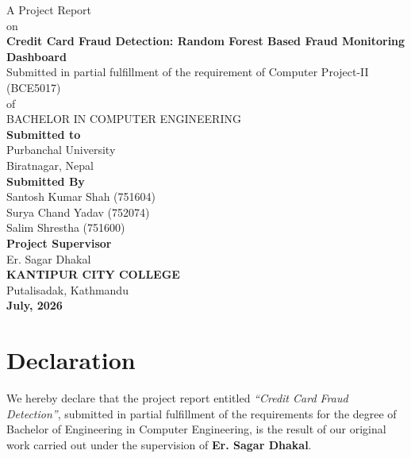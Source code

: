 \documentclass[12pt,a4paper]{report}
\newcommand{\projecttitle}{Credit Card Fraud Detection}
\newcommand{\projectsubtitle}{Random Forest Based Fraud Monitoring Dashboard}
\newcommand{\projectdate}{July, 2026}
\newcommand{\supervisor}{Er. Sagar Dhakal}
\newcommand{\college}{Kantipur City College}
\newcommand{\collegeaddress}{Putalisadak, Kathmandu}
\begin{document}
\begin{titlepage}
    \thispagestyle{empty}
    \centering
    {\Large A Project Report}\\[0.3cm]
    {\Large on}\\[0.3cm]
    {\Large \textbf{\projecttitle : \projectsubtitle}}\\[0.7cm]
    {\large Submitted in partial fulfillment of the requirement of
    Computer Project-II (BCE5017)}\\[0.4cm]
    {\Large of}\\[0.4cm]
    {BACHELOR IN COMPUTER ENGINEERING}\\[0.9cm]
    {\large \textbf{Submitted to}}\\[0.2cm]
    {\large Purbanchal University}\\[0.15cm]
    {\large Biratnagar, Nepal}\\[0.9cm]
    {\large \textbf{Submitted By}}\\[0.2cm]
    {\large Santosh Kumar Shah (751604)}\\
    {\large Surya Chand Yadav (752074)}\\
    {\large Salim Shrestha (751600)}\\[0.9cm]
    {\large \textbf{Project Supervisor}}\\[0.2cm]
    {\large \supervisor}\\[0.9cm]
    {\large \textbf{\MakeUppercase{\college}}}\\[0.15cm]
    {\large \collegeaddress}\\
    \vfill
    {\large \textbf{\projectdate}}
\end{titlepage}

\hypersetup{pageanchor=true}
\setcounter{page}{2}
\onehalfspacing

\chapter*{Declaration}

We hereby declare that the project report entitled \textit{``\projecttitle''}, submitted in partial fulfillment of the requirements for the degree of Bachelor of Engineering in Computer Engineering, is the result of our original work carried out under the supervision of \textbf{\supervisor}.
\end{document}
